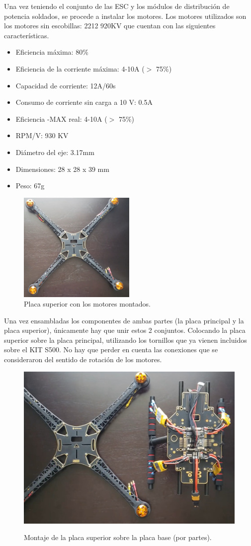\noindent Una vez teniendo el conjunto de las ESC y los módulos de distribución de potencia soldados, se procede a instalar los motores. Los motores utilizados son los motores sin escobillas: 2212 920KV que cuentan con las siguientes características.
\begin{itemize}
    \item Eficiencia máxima: 80\%
    \item Eficiencia de la corriente máxima: 4-10A ($>$ 75\%)
    \item Capacidad de corriente: 12A/60s
    \item Consumo de corriente sin carga a 10 V: 0.5A
    \item Eficiencia -MAX real: 4-10A ($>$ 75\%)
    \item RPM/V: 930 KV
    \item Diámetro del eje: 3.17mm
    \item Dimensiones: 28 x 28 x 39 mm
    \item Peso: 67g
\end{itemize}
\newpage
\begin{figure}[H]
    \centering
    \includegraphics[width=0.5\textwidth]{imagenes/placa-motores.png}
    \caption{Placa superior con los motores montados.}
    \label{fig:basetren}
\end{figure}
\noindent Una vez ensambladas los componentes de ambas partes (la placa principal y la placa superior), únicamente hay que unir estos 2 conjuntos. Colocando la placa superior sobre la placa principal, utilizando los tornillos que ya vienen incluidos sobre el KIT S500. No hay que perder en cuenta las conexiones que se consideraron del sentido de rotación de los motores.
\begin{figure}[H]
    \centering
    {\includegraphics[width=0.5\linewidth]{imagenes/superior-inferior.png}}
    \caption{Montaje de la placa superior sobre la placa base (por partes).}
    \label{fig:lora-solo-parte1}
\end{figure}

